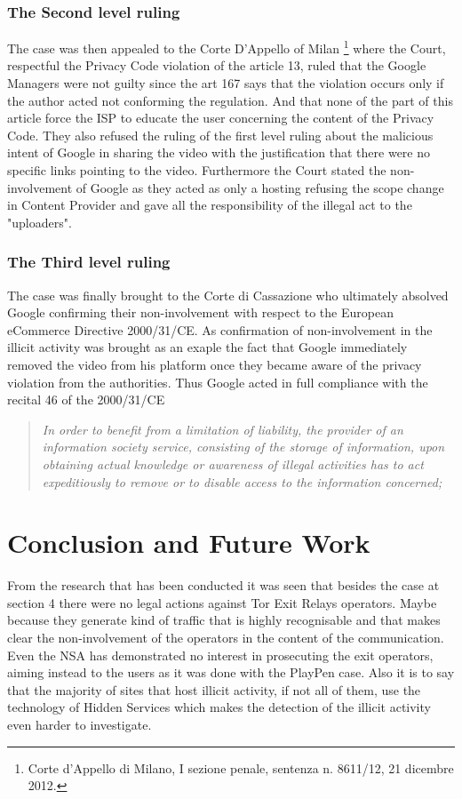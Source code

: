 \documentclass[runningheads,a4paper]{llncs}
\begin{document}
\subsubsection{The Second level ruling}
The case was then appealed to the Corte D'Appello of Milan
\footnote{
Corte d’Appello di Milano, I sezione penale, sentenza n. 8611/12, 21 dicembre 2012.
} where the Court, respectful the Privacy Code violation of the article 13, ruled that the Google Managers were not guilty since the art 167 says that the violation occurs only if the author acted not conforming the regulation. And that none of the part of this article force the ISP to educate the user concerning the content of the Privacy Code. \cite{NOTARI}
They also refused the ruling of the first level ruling about the malicious intent of Google in sharing the video with the justification that there were no specific links pointing to the video. Furthermore the Court stated the non-involvement of Google as they acted as only a hosting refusing the scope change in Content Provider and gave all the responsibility of the illegal act to the "uploaders". 

\subsubsection{The Third level ruling}
The case was finally brought to the Corte di Cassazione who ultimately absolved Google confirming their non-involvement with respect to the European eCommerce Directive 2000/31/CE. As confirmation of non-involvement in the illicit activity was brought as an exaple the fact that Google immediately removed the video from his platform once they became aware of the privacy violation from the authorities. Thus Google acted in full compliance with the recital 46 of the 2000/31/CE \begin{quote}
    \textit{
    In order to benefit from a limitation of liability, the provider of an information society service, consisting of the storage of information, upon obtaining actual knowledge or awareness of illegal activities has to act expeditiously to remove or to disable access to the information concerned; 
    }
\end{quote}



\section{Conclusion and Future Work}

From the research that has been conducted it was seen that besides the case at section 4 there were no legal actions against Tor Exit Relays operators. Maybe because they generate kind of traffic that is highly recognisable and that makes clear the non-involvement of the operators in the content of the communication.
Even the NSA has demonstrated no interest in prosecuting the exit operators, aiming instead to the users as it was done with the PlayPen case. Also it is to say that the majority of sites that host illicit activity, if not all of them, use the technology of Hidden Services which makes the detection of the illicit activity even harder to investigate.
\end{document}
